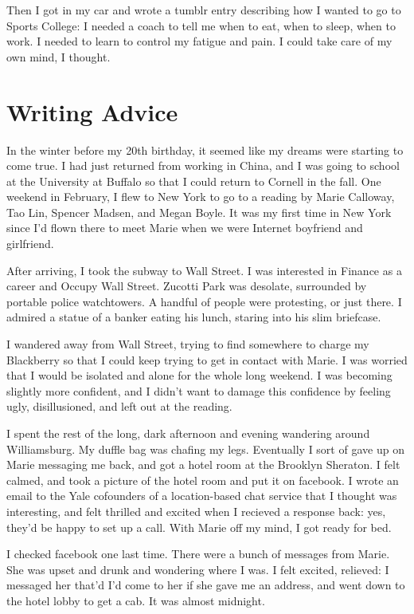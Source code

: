 \documentclass[12pt]{article}
\begin{document}
Then I got in my car and wrote a tumblr entry describing how I wanted to go to
Sports College: I needed a coach to tell me when to eat, when to sleep, when to
work.  I needed to learn to control my fatigue and pain.  I could take care of
my own mind, I thought.

\section{Writing Advice}
In the winter before my 20th birthday, it seemed like my dreams were starting to
come true.  I had just returned from working in China, and I was going to school
at the University at Buffalo so that I could return to Cornell in the fall.  One
weekend in February, I flew to New York to go to a reading by Marie Calloway,
Tao Lin, Spencer Madsen, and Megan Boyle.  It was my first time in New York
since I'd flown there to meet Marie when we were Internet boyfriend and
girlfriend.  

After arriving, I took the subway to Wall Street.  I was interested in Finance
as a career and Occupy Wall Street.  Zucotti Park was desolate, surrounded by
portable police watchtowers. A handful of people were protesting, or just there.
I admired a statue of a banker eating his lunch, staring into his slim
briefcase.

I wandered away from Wall Street, trying to find somewhere to charge my
Blackberry  so that I could keep trying to get in contact with Marie. I was
worried that I would be isolated and alone for the whole long weekend.  I was
becoming slightly more confident, and I didn't want to damage this confidence by
feeling ugly, disillusioned, and left out at the reading.

I spent the rest of the long, dark afternoon and evening wandering around
Williamsburg.  My duffle bag was chafing my legs.  Eventually I sort of gave up
on Marie messaging me back, and got a hotel room at the Brooklyn Sheraton.  I
felt calmed, and took a picture of the hotel room and put it on facebook.  I
wrote an email to the Yale cofounders of a location-based chat service that I
thought was interesting, and felt thrilled and excited when I recieved a
response back: yes, they'd be happy to set up a call.  With Marie off my mind, I
got ready for bed.  

I checked facebook one last time.  There were a bunch of messages from Marie.
She was upset and drunk and wondering where I was.  I felt excited, relieved: I
messaged her that'd I'd come to her if she gave me an address, and went down to
the hotel lobby to get a cab.  It was almost midnight.
\end{document}
